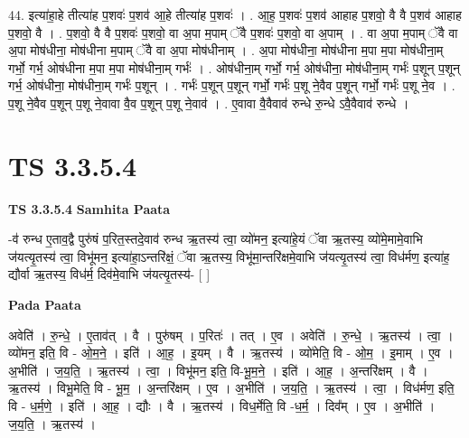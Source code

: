\documentclass[17pt]{extarticle}
\begin{document}
44. इत्या॑हा॒हे तीत्या॑ह प॒शवः॑ प॒शव॑ आ॒हे तीत्या॑ह प॒शवः॑ । . आ॒ह॒ प॒शवः॑ प॒शव॑ आहाह प॒शवो॒ वै वै प॒शव॑ आहाह प॒शवो॒ वै । . प॒शवो॒ वै वै प॒शवः॑ प॒शवो॒ वा अ॒पा म॒पाम् ॅवै प॒शवः॑ प॒शवो॒ वा अ॒पाम् । . वा अ॒पा म॒पाम् ॅवै वा अ॒पा मोष॑धीना॒ मोष॑धीना म॒पाम् ॅवै वा अ॒पा मोष॑धीनाम् । . अ॒पा मोष॑धीना॒ मोष॑धीना म॒पा म॒पा मोष॑धीना॒म् गर्भो॒ गर्भ॒ ओष॑धीना म॒पा म॒पा मोष॑धीना॒म् गर्भः॑ । . ओष॑धीना॒म् गर्भो॒ गर्भ॒ ओष॑धीना॒ मोष॑धीना॒म् गर्भः॑ प॒शून् प॒शून् गर्भ॒ ओष॑धीना॒ मोष॑धीना॒म् गर्भः॑ प॒शून् । . गर्भः॑ प॒शून् प॒शून् गर्भो॒ गर्भः॑ प॒शू ने॒वैव प॒शून् गर्भो॒ गर्भः॑ प॒शू ने॒व । . प॒शू ने॒वैव प॒शून् प॒शू ने॒वावा वै॒व प॒शून् प॒शू ने॒वाव॑ । . ए॒वावा वै॒वैवाव॑ रुन्धे रु॒न्धे ऽवै॒वैवाव॑ रुन्धे । \newline
\pagebreak
{}

\section{ TS 3.3.5.4 }

\textbf{TS 3.3.5.4 } \newline
\textbf{Samhita Paata} \newline

-व॑ रुन्ध ए॒ताव॒द्वै पुरु॑षं प॒रित॒स्तदे॒वाव॑ रुन्ध ऋ॒तस्य॑ त्वा॒ व्यो॑मन॒ इत्या॑हे॒यं ॅवा ऋ॒तस्य॒ व्यो॑मे॒मामे॒वाभि ज॑यत्यृ॒तस्य॑ त्वा॒ विभू॑मन॒ इत्या॑हा॒ऽन्तरि॑क्षं॒ ॅवा ऋ॒तस्य॒ विभू॑मा॒न्तरि॑क्षमे॒वाभि ज॑यत्यृ॒तस्य॑ त्वा॒ विध॑र्मण॒ इत्या॑ह॒ द्यौर्वा ऋ॒तस्य॒ विध॑र्म॒ दिव॑मे॒वाभि ज॑यत्यृ॒तस्य॑- [  ] \newline

\textbf{Pada Paata} \newline

अवेति॑ । रु॒न्धे॒ । ए॒ताव॑त् । वै । पुरु॑षम् । प॒रितः॑ । तत् । ए॒व । अवेति॑ । रु॒न्धे॒ । ऋ॒तस्य॑ । त्वा॒ । व्यो॑मन॒ इति॒ वि - ओ॒म॒ने॒ । इति॑ । आ॒ह॒ । इ॒यम् । वै । ऋ॒तस्य॑ । व्यो॑मेति॒ वि - ओ॒म॒ । इ॒माम् । ए॒व । अ॒भीति॑ । ज॒य॒ति॒ । ऋ॒तस्य॑ । त्वा॒ । विभू॑मन॒ इति॒ वि-भू॒म॒ने॒ । इति॑ । आ॒ह॒ । अ॒न्तरि॑क्षम् । वै । ऋ॒तस्य॑ । विभू॒मेति॒ वि - भू॒म॒ । अ॒न्तरि॑क्षम् । ए॒व । अ॒भीति॑ । ज॒य॒ति॒ । ऋ॒तस्य॑ । त्वा॒ । विध॑र्मण॒ इति॒ वि - ध॒र्म॒णे॒ । इति॑ । आ॒ह॒ । द्यौः । वै । ऋ॒तस्य॑ । विध॒र्मेति॒ वि -ध॒र्म॒ । दिव᳚म् । ए॒व । अ॒भीति॑ । ज॒य॒ति॒ । ऋ॒तस्य॑ ।  \newline
\end{document}
